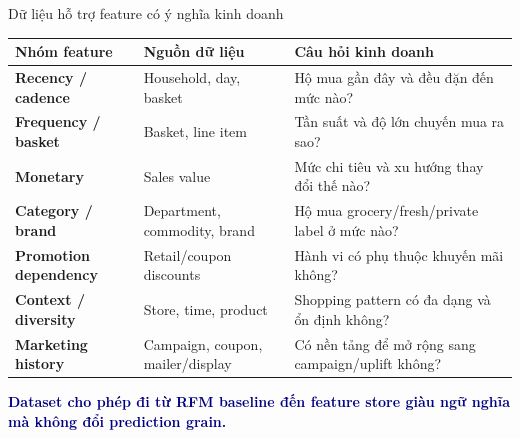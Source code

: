 \documentclass[aspectratio=169,11pt]{beamer}
\begin{document}
\begin{frame}{Dữ liệu hỗ trợ feature có ý nghĩa kinh doanh}
  \small
  \begin{tabularx}{\textwidth}{>{\bfseries}p{3.1cm}p{4.3cm}X}
    \toprule
    Nhóm feature & Nguồn dữ liệu & Câu hỏi kinh doanh \\
    \midrule
    Recency / cadence & Household, day, basket & Hộ mua gần đây và đều đặn đến mức nào? \\
    Frequency / basket & Basket, line item & Tần suất và độ lớn chuyến mua ra sao? \\
    Monetary & Sales value & Mức chi tiêu và xu hướng thay đổi thế nào? \\
    Category / brand & Department, commodity, brand & Hộ mua grocery/fresh/private label ở mức nào? \\
    Promotion dependency & Retail/coupon discounts & Hành vi có phụ thuộc khuyến mãi không? \\
    Context / diversity & Store, time, product & Shopping pattern có đa dạng và ổn định không? \\
    Marketing history & Campaign, coupon, mailer/display & Có nền tảng để mở rộng sang campaign/uplift không? \\
    \bottomrule
  \end{tabularx}
  \vspace{0.3cm}
  \begin{center}
    \textcolor{Navy}{\bfseries Dataset cho phép đi từ RFM baseline đến feature store
    giàu ngữ nghĩa mà không đổi prediction grain.}
  \end{center}
\end{frame}
\end{document}
